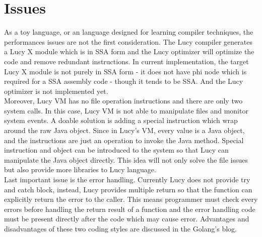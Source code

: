 \section{Issues}
As a toy language, or an language designed for learning compiler techniques, the performances issues are not the first consideration. The Lucy compiler generates a Lucy X module which is in SSA form and the Lucy optimizer will optimize the code and remove redundant instructions. In current implementation, the target Lucy X module is not purely in SSA form - it does not have phi node which is required for a SSA assembly code - though it tends to be SSA. And the Lucy optimizer is not implemented yet. \\
Moreover, Lucy VM has no file operation instructions and there are only two system calls. In this case, Lucy VM is not able to manipulate files and monitor system events. A doable solution is adding a special instruction which wrap around the raw Java object. Since in Lucy's VM, every value is a Java object, and the instructions are just an operation to invoke the Java method. Special instruction and object can be introduced to the system so that Lucy can manipulate the Java object directly. This idea will not only solve the file issues but also provide more libraries to Lucy language. \\
Last important issue is the error handling. Currently Lucy does not provide try and catch block, instead, Lucy provides multiple return so that the function can explicitly return the error to the caller. This means programmer must check every errors before handling the return result of a function and the error handling code must be present directly after the code which may cause error. Advantages and disadvantages of these two coding styles are discussed in the Golang's blog.
